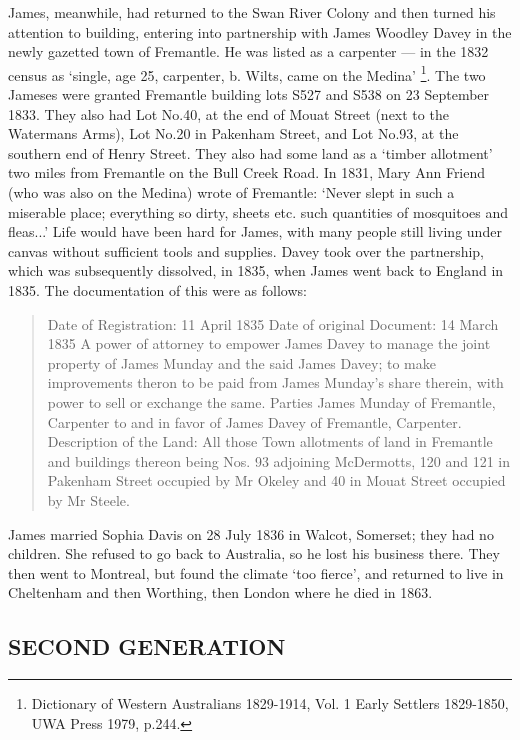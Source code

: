 James, meanwhile, had returned to the Swan River Colony and then turned his attention to building, entering into partnership with James Woodley Davey in the newly gazetted town of Fremantle. He was listed as a carpenter — in the 1832 census as `single, age 25, carpenter, b. Wilts, came on the Medina' \footnote{Dictionary of Western Australians 1829-1914, Vol. 1 Early Settlers 1829-1850, UWA Press 1979, p.244.}. The two Jameses were granted Fremantle building lots S527 and S538 on 23 September 1833. They also had Lot No.40, at the end of Mouat Street (next to the Watermans Arms), Lot No.20 in Pakenham Street, and Lot No.93, at the southern end of Henry Street. They also had some land as a `timber allotment' two miles from Fremantle on the Bull Creek Road. In 1831, Mary Ann Friend (who was also on the Medina) wrote of Fremantle: `Never slept in such a miserable place; everything so dirty, sheets etc. such quantities of mosquitoes and fleas...'  Life would have been hard for James, with many people still living under canvas without sufficient tools and supplies. 
Davey took over the partnership, which was subsequently dissolved, in 1835, when James went back to England in 1835. The documentation of this were as follows:
\begin{quotation}
Date of Registration: 11 April 1835
Date of original Document: 14 March 1835
A power of attorney to empower James Davey to manage the joint property of James Munday and the said James Davey; to make improvements theron to be paid from James Munday's share therein, with power to sell or exchange the same. Parties James Munday of Fremantle, Carpenter to and in favor of James Davey of Fremantle, Carpenter.
Description of the Land:
All those Town allotments of land in Fremantle and buildings thereon being
Nos. 93 adjoining McDermotts,
120 and 121 in Pakenham Street occupied by Mr Okeley and
40 in Mouat Street occupied by Mr Steele.
\end{quotation}

James married Sophia Davis on 28 July 1836 in Walcot, Somerset; they had no children.  She refused to go back to Australia, so he lost his business there. They then went to Montreal, but found the climate `too fierce', and returned to live in Cheltenham and then Worthing, then London where he died in 1863.

\subsection{SECOND GENERATION}

